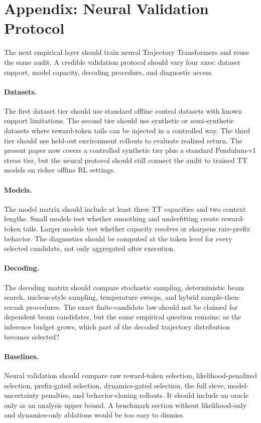 \documentclass{article}
\begin{document}
\section{Appendix: Neural Validation Protocol}

The next empirical layer should train neural Trajectory Transformers and reuse the same audit. A credible validation protocol should vary four axes: dataset support, model capacity, decoding procedure, and diagnostic access.

\paragraph{Datasets.}
The first dataset tier should use standard offline control datasets with known support limitations. The second tier should use synthetic or semi-synthetic datasets where reward-token tails can be injected in a controlled way. The third tier should use held-out environment rollouts to evaluate realized return. The present paper now covers a controlled synthetic tier plus a standard Pendulum-v1 stress tier, but the neural protocol should still connect the audit to trained TT models on richer offline RL settings.

\paragraph{Models.}
The model matrix should include at least three TT capacities and two context lengths. Small models test whether smoothing and underfitting create reward-token tails. Larger models test whether capacity resolves or sharpens rare-prefix behavior. The diagnostics should be computed at the token level for every selected candidate, not only aggregated after execution.

\paragraph{Decoding.}
The decoding matrix should compare stochastic sampling, deterministic beam search, nucleus-style sampling, temperature sweeps, and hybrid sample-then-rerank procedures. The exact finite-candidate law should not be claimed for dependent beam candidates, but the same empirical question remains: as the inference budget grows, which part of the decoded trajectory distribution becomes selected?

\paragraph{Baselines.}
Neural validation should compare raw reward-token selection, likelihood-penalized selection, prefix-gated selection, dynamics-gated selection, the full sieve, model-uncertainty penalties, and behavior-cloning rollouts. It should include an oracle only as an analysis upper bound. A benchmark section without likelihood-only and dynamics-only ablations would be too easy to dismiss.
\end{document}
